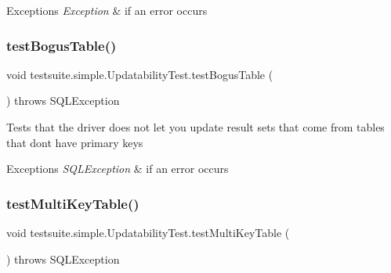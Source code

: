 \begin{DoxyExceptions}{Exceptions}
{\em Exception} & if an error occurs \\
\hline
\end{DoxyExceptions}
\mbox{\label{classtestsuite_1_1simple_1_1_updatability_test_ac636788ee577887fe30ac0119eaba824}} 
\subsubsection{\texorpdfstring{test\+Bogus\+Table()}{testBogusTable()}}
{\footnotesize\ttfamily void testsuite.\+simple.\+Updatability\+Test.\+test\+Bogus\+Table (\begin{DoxyParamCaption}{ }\end{DoxyParamCaption}) throws S\+Q\+L\+Exception}

Tests that the driver does not let you update result sets that come from tables that don\textquotesingle{}t have primary keys


\begin{DoxyExceptions}{Exceptions}
{\em S\+Q\+L\+Exception} & if an error occurs \\
\hline
\end{DoxyExceptions}
\mbox{\label{classtestsuite_1_1simple_1_1_updatability_test_a689afecd2b1890b04a4c7b3a34fba460}} 
\subsubsection{\texorpdfstring{test\+Multi\+Key\+Table()}{testMultiKeyTable()}}
{\footnotesize\ttfamily void testsuite.\+simple.\+Updatability\+Test.\+test\+Multi\+Key\+Table (\begin{DoxyParamCaption}{ }\end{DoxyParamCaption}) throws S\+Q\+L\+Exception}

